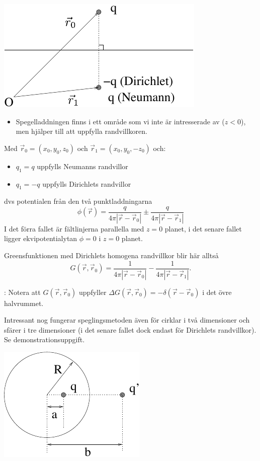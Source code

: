 \documentclass[%
oneside,                 %
final,                   %
10pt]{article}
\newcommand{\longinlinecomment}[3]{{\color{red}{\bf #1}: #2}}
\begin{document}
\centerline{\includegraphics[width=0.5\linewidth]{fig/spegling.pdf}}



\begin{itemize}
\item Spegelladdningen finns i ett område som vi inte är intresserade av ($z<0$), men hjälper till att uppfylla randvillkoren.
\end{itemize}

\noindent
Med $\vec{r}_0 = (x_0,y_0,z_0)$ och $\vec{r}_1 = (x_0,y_0,-z_0)$ och:
\begin{itemize}
\item $q_1 = q$ uppfylls Neumanns randvillor

\item $q_1 = -q$ uppfylls Dirichlets randvillor
\end{itemize}

\noindent
dvs potentialen från den två punktladdningarna
$$
\phi(\vec{r}) = \frac{q}{4 \pi |\vec{r} - \vec{r}_0|} \pm \frac{q}{4 \pi |\vec{r} - \vec{r}_1|}
$$
I det förra fallet är fältlinjerna parallella med $z=0$ planet, i det senare fallet ligger ekvipotentialytan $\phi=0$ i $z=0$ planet.

Greensfunktionen med Dirichlets homogena randvillkor blir här alltså
$$
G (\vec{r},\vec{r}_0)=\frac{1}{4\pi|\vec{r}-\vec{r}_0|} - \frac{1} {4\pi|\vec{r}-\vec{r}_1|}.
$$

\longinlinecomment{Comment 4}{ Notera att $G(\vec{r},\vec{r}_0)$ uppfyller $\Delta G(\vec{r},\vec{r}_0) = - \delta(\vec{r}-\vec{r}_0)$ i det övre halvrummet. }{ Notera att $G(\vec{r},\vec{r}_0)$ uppfyller }

Intressant nog fungerar speglingsmetoden även för cirklar i två dimensioner och sfärer i tre dimensioner (i det senare fallet dock endast för Dirichlets randvillkor). Se demonstrationsuppgift.



\centerline{\includegraphics[width=0.5\linewidth]{fig/spegling2.pdf}}
\end{document}
